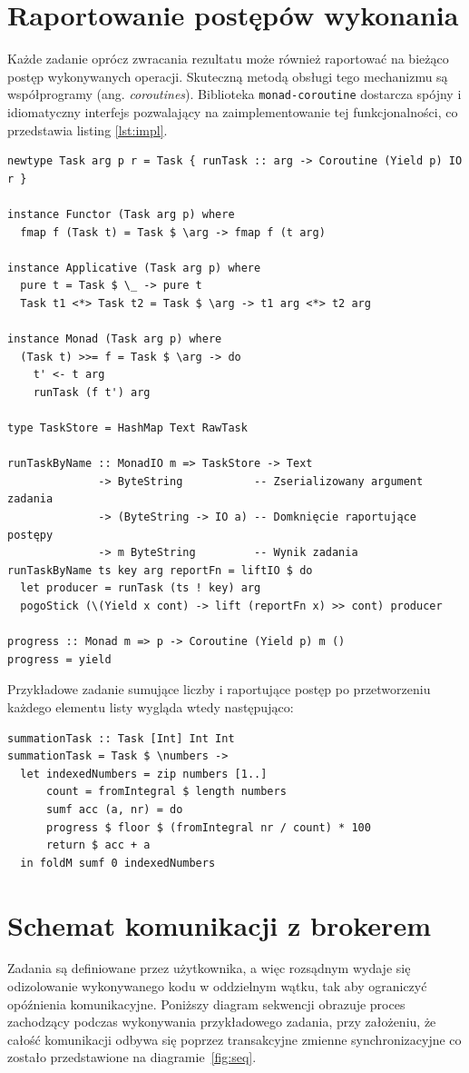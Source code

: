 \section{Raportowanie postępów wykonania}
\label{sec:rap}
Każde zadanie oprócz zwracania rezultatu może również raportować na bieżąco postęp wykonywanych operacji. Skuteczną metodą obsługi tego mechanizmu są współprogramy (ang. \textit{coroutines}). Biblioteka \texttt{monad-coroutine} \cite{Coroutine} dostarcza spójny i idiomatyczny interfejs pozwalający na zaimplementowanie tej funkcjonalności, co przedstawia listing \ref{lst:impl}.

\begin{lstlisting}[caption=Ostateczna implementacja zadania, label=lst:impl]
newtype Task arg p r = Task { runTask :: arg -> Coroutine (Yield p) IO r }
  
instance Functor (Task arg p) where
  fmap f (Task t) = Task $ \arg -> fmap f (t arg)
  
instance Applicative (Task arg p) where
  pure t = Task $ \_ -> pure t
  Task t1 <*> Task t2 = Task $ \arg -> t1 arg <*> t2 arg
  
instance Monad (Task arg p) where
  (Task t) >>= f = Task $ \arg -> do
    t' <- t arg
    runTask (f t') arg 
  
type TaskStore = HashMap Text RawTask

runTaskByName :: MonadIO m => TaskStore -> Text 
              -> ByteString           -- Zserializowany argument zadania
              -> (ByteString -> IO a) -- Domknięcie raportujące postępy
              -> m ByteString         -- Wynik zadania
runTaskByName ts key arg reportFn = liftIO $ do
  let producer = runTask (ts ! key) arg
  pogoStick (\(Yield x cont) -> lift (reportFn x) >> cont) producer

progress :: Monad m => p -> Coroutine (Yield p) m ()
progress = yield
\end{lstlisting}
\newpage
Przykładowe zadanie sumujące liczby i raportujące postęp po przetworzeniu każdego elementu listy wygląda wtedy następująco:
\begin{lstlisting}
summationTask :: Task [Int] Int Int
summationTask = Task $ \numbers -> 
  let indexedNumbers = zip numbers [1..]
      count = fromIntegral $ length numbers
      sumf acc (a, nr) = do
      progress $ floor $ (fromIntegral nr / count) * 100
      return $ acc + a
  in foldM sumf 0 indexedNumbers
\end{lstlisting}

\section{Schemat komunikacji z brokerem}
Zadania są definiowane przez użytkownika, a więc rozsądnym wydaje się odizolowanie wykonywanego kodu w oddzielnym wątku, tak aby ograniczyć opóźnienia komunikacyjne. Poniższy diagram sekwencji obrazuje proces zachodzący podczas wykonywania przykładowego zadania, przy założeniu, że całość komunikacji odbywa się poprzez transakcyjne zmienne synchronizacyjne \cite{Stm} co zostało przedstawione na diagramie~\ref{fig:seq}.

